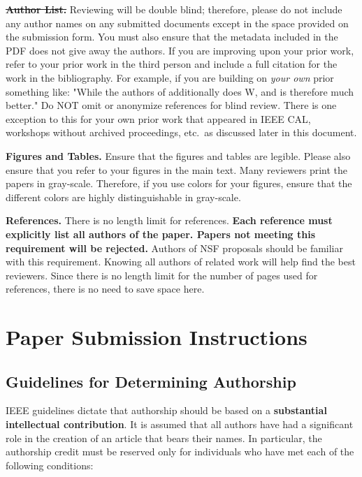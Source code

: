 \documentclass{sig-alternate}
\begin{document}
\noindent\textbf{\sout{Author List.}} Reviewing will be double blind;
therefore, please do not include any author names on any submitted
documents except in the space provided on the submission form.  You must
also ensure that the metadata included in the PDF does not give away the
authors. If you are improving upon your prior work, refer to your prior
work in the third person and include a full citation for the work in the
bibliography.  For example, if you are building on {\em your own} prior
something like: "While the authors of
additionally does W, and is therefore much better."  Do NOT omit or
anonymize references for blind review.  There is one exception to this for
your own prior work that appeared in IEEE CAL, workshops without archived
proceedings, etc.\, as discussed later in this document.

\noindent\textbf{Figures and Tables.} Ensure that the figures and tables
are legible.  Please also ensure that you refer to your figures in the main
text.  Many reviewers print the papers in gray-scale. Therefore, if you use
colors for your figures, ensure that the different colors are highly
distinguishable in gray-scale.

\noindent\textbf{References.}  There is no length limit for references.
{\bf Each reference must explicitly list all authors of the paper.  Papers
not meeting this requirement will be rejected.} Authors of NSF proposals
should be familiar with this requirement. Knowing all authors of related
work will help find the best reviewers. Since there is no length limit
for the number of pages used for references, there is no need to save space
here.

\section{Paper Submission Instructions}

\subsection{Guidelines for Determining Authorship}


IEEE guidelines dictate that authorship should be based on a {\bf
  substantial intellectual contribution}. It is assumed that all
authors have had a significant role in the creation of an article that
bears their names. In particular, the authorship credit must be
reserved only for individuals who have met each of the following
conditions:
\end{document}
